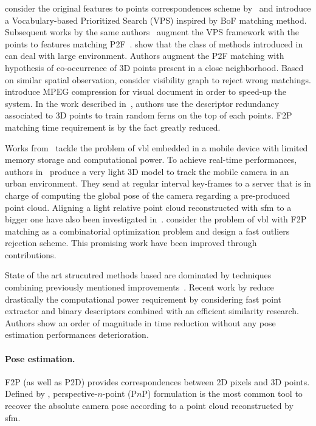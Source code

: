 \citet{Sattler2011} consider the original features to points correspondences scheme by~\citep{Irschara2009} and introduce a Vocabulary-based Prioritized Search (VPS) inspired by BoF matching method. Subsequent works by the same authors~\citep{Sattler2012} augment the VPS framework with the points to features matching P2F~\citep{Li2010}. \citet{Li2012} show that the class of methods introduced in~\citep{Irschara2009,Li2010} can deal with large environment. Authors augment the P2F matching with hypothesis of co-occurrence of 3D points present in a close neighborhood. Based on similar spatial observation, \citet{Sattler2015} consider visibility graph to reject wrong matchings. \citet{Heisterklaus2014} introduce MPEG compression for visual document in order to speed-up the system. In the work described in~\citep{Donoser2014}, authors use the descriptor redundancy associated to 3D points to train random ferns on the top of each points. F2P matching time requirement is by the fact greatly reduced. 

Works from~\citep{Middelberg2014,Lynen2015} tackle the problem of \ac{vbl} embedded in a mobile device with limited memory storage and computational power. To achieve real-time performances, authors in~\citep{Middelberg2014} produce a very light 3D model to track the mobile camera in an urban environment. They send at regular interval key-frames to a server that is in charge of computing the global pose of the camera regarding a pre-produced point cloud. Aligning a light relative point cloud reconstructed with \ac{sfm} to a bigger one have also been investigated in~\citep{Lu2015}. \citet{Svarm2014} consider the problem of \ac{vbl} with F2P matching as a combinatorial optimization problem and design a fast outliers rejection scheme. This promising work have been improved through~\citep{Zeisl2015,Svarm2016} contributions.

State of the art strucutred methods based are dominated by techniques combining previously mentioned improvements~\citep{Sattler2016a}. Recent work by \citet{Feng2016a} reduce drastically the computational power requirement by considering fast point extractor and binary descriptors combined with an efficient similarity research. Authors show an order of magnitude in time reduction without any pose estimation performances deterioration.

\paragraph{Pose estimation.}
\label{para:pose_estimation}
F2P (as well as P2D) provides correspondences between 2D pixels and 3D points. Defined by \citet{Hartley2003}, perspective-$n$-point (P$n$P) formulation is the most common tool to recover the absolute camera pose according to a point cloud reconstructed by \ac{sfm}.

